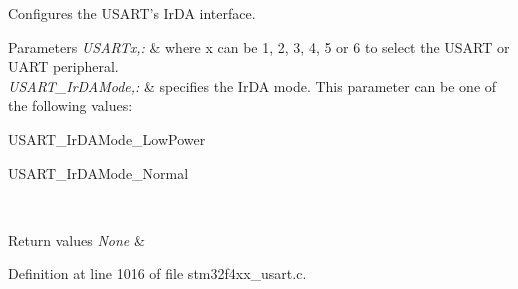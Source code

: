 Configures the U\-S\-A\-R\-T's Ir\-D\-A interface. 


\begin{DoxyParams}{Parameters}
{\em U\-S\-A\-R\-Tx,\-:} & where x can be 1, 2, 3, 4, 5 or 6 to select the U\-S\-A\-R\-T or U\-A\-R\-T peripheral. \\
\hline
{\em U\-S\-A\-R\-T\-\_\-\-Ir\-D\-A\-Mode,\-:} & specifies the Ir\-D\-A mode. This parameter can be one of the following values\-: \begin{DoxyItemize}
\item U\-S\-A\-R\-T\-\_\-\-Ir\-D\-A\-Mode\-\_\-\-Low\-Power \item U\-S\-A\-R\-T\-\_\-\-Ir\-D\-A\-Mode\-\_\-\-Normal \end{DoxyItemize}
\\
\hline
\end{DoxyParams}

\begin{DoxyRetVals}{Return values}
{\em None} & \\
\hline
\end{DoxyRetVals}


Definition at line 1016 of file stm32f4xx\-\_\-usart.\-c.

